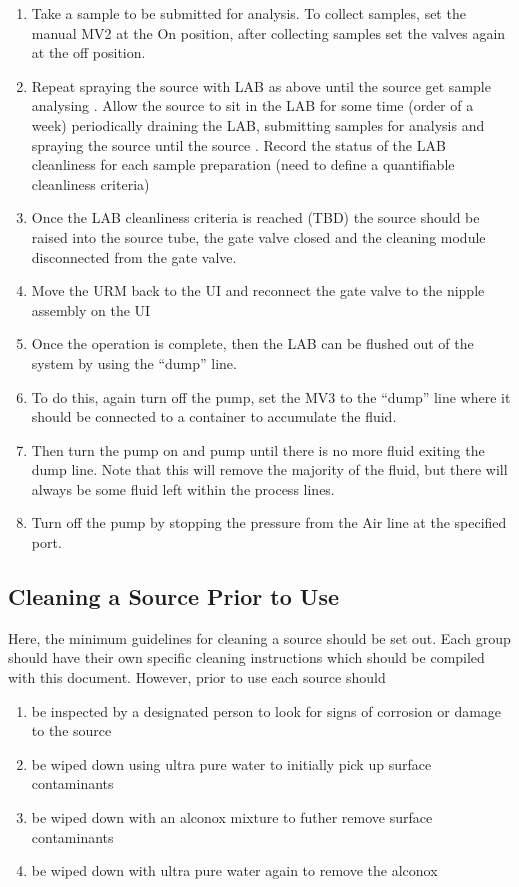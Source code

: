 \begin{enumerate}
\item Take a sample to be submitted for analysis. To collect samples, set the manual MV2 at the On position, after collecting samples set the valves again at the off position.
\item Repeat spraying the source with LAB as above until the source get sample analysing . Allow the source to sit in the LAB for some time (order of a week) periodically draining the LAB, submitting samples for analysis and spraying the source until the source . Record the status of the LAB cleanliness for each sample preparation (need to define a quantifiable cleanliness criteria)
\item Once the LAB cleanliness criteria is reached (TBD) the source should be raised into the source tube, the gate valve closed and the cleaning module disconnected from the gate valve. 
\item Move the URM back to the UI and reconnect the gate valve to the nipple assembly on the UI
\item Once the operation is complete, then the LAB can be flushed out of the system by using the “dump” line. 
\item To do this, again turn off the pump, set the MV3 to the “dump” line where it should be connected to a container to accumulate the fluid. 
\item Then turn the pump on and pump until there is no more fluid exiting the dump line. Note that this will remove the majority of the fluid, but there will always be some fluid left within the process lines. 
\item Turn off the pump by stopping the pressure from the Air line at the specified port. 
\end{enumerate}

\subsection{Cleaning a Source Prior to Use}
Here, the minimum guidelines for cleaning a source should be set out. Each group should have their own specific cleaning instructions which should be compiled with this document. However, prior to use each source should
\begin{enumerate}
\item be inspected by a designated person to look for signs of corrosion or damage to the source
\item be wiped down using ultra pure water to initially pick up surface contaminants
\item be wiped down with an alconox mixture to futher remove surface contaminants
\item be wiped down with ultra pure water again to remove the alconox
\end{enumerate}

